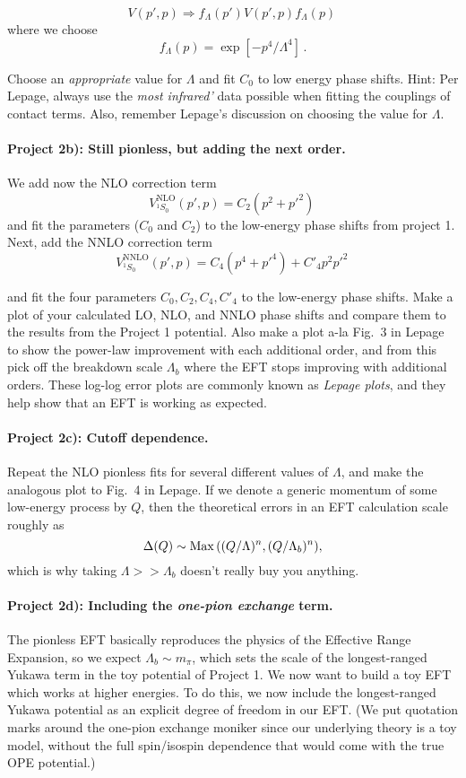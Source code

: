 \documentclass[%
oneside,                 %
final,                   %
10pt]{article}
\begin{document}
\[
V(p',p)\Rightarrow f_{\Lambda}(p')V(p',p)f_{\Lambda}(p)\,
\] 
where we choose
\[
f_{\Lambda}(p) = \exp{[-p^4/\Lambda^4]}\,.
\]

Choose an \emph{appropriate} value for $\Lambda$ and fit $C_0$ to low
energy phase shifts. Hint: Per Lepage, always use the \emph{most infrared'} data possible when fitting the couplings of contact
terms. Also, remember Lepage's discussion on choosing the value for
$\Lambda$.


\paragraph{Project 2b): Still pionless, but adding the next order.}
We add now the NLO correction term
\[
V^\mathrm{NLO}_{^1S_0}(p',p)=C_2(p^2 + p'^2)\,
\]
and fit the parameters ($C_0$ and $C_2$) to the low-energy phase shifts from project 1. Next, add the NNLO correction term
\[
V^\mathrm{NNLO}_{^1S_0}(p',p)=C_4(p^4 + p'^4) + C'_4 p^2p'^2\,
\]

and fit the four parameters $C_0,C_2,C_4,C'_4$ to the low-energy phase
shifts.  Make a plot of your calculated LO, NLO, and NNLO phase shifts
and compare them to the results from the Project 1 potential. Also
make a plot a-la Fig.~3 in Lepage to show the power-law improvement
with each additional order, and from this pick off the breakdown scale
$\Lambda_b$ where the EFT stops improving with additional
orders. These log-log error plots are commonly known as \emph{Lepage plots}, and they help show that an EFT is working as expected.

\paragraph{Project 2c): Cutoff dependence.}
Repeat the NLO pionless fits for several different values of $\Lambda$, and make the analogous plot to Fig.~4 in Lepage. If we denote a generic momentum of some low-energy process by $Q$, then the theoretical errors in an EFT calculation scale roughly as 
\[
\Delta(Q) \sim {\rm Max}\,{((Q/\Lambda)^n, (Q/\Lambda_b)^n)},
\]
which is why taking $\Lambda >> \Lambda_b$ doesn't really buy you anything. 

\paragraph{Project 2d): Including the \emph{one-pion exchange} term.}
The pionless EFT basically reproduces the physics of the Effective
Range Expansion, so we expect $\Lambda_b\sim m_{\pi}$, which sets the
scale of the longest-ranged Yukawa term in the toy potential of
Project 1. We now want to build a toy EFT which works at higher
energies. To do this, we now include the longest-ranged Yukawa
potential as an explicit degree of freedom in our EFT. (We put
quotation marks around the one-pion exchange moniker since our
underlying theory is a toy model, without the full spin/isospin
dependence that would come with the true OPE potential.)
\end{document}
